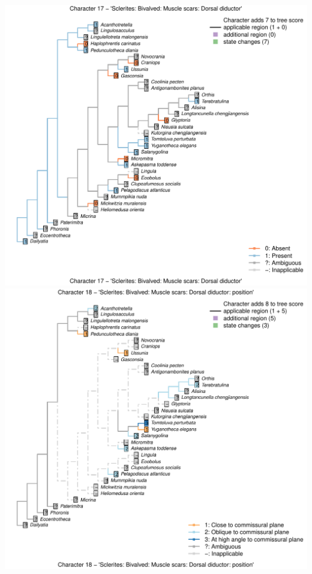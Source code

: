 \documentclass[]{book}
\theoremstyle{definition}
\theoremstyle{definition}
\theoremstyle{definition}
\theoremstyle{remark}
\begin{document}
\includegraphics{Brachiopod_phylogeny_files/figure-latex/unnamed-chunk-4-17.pdf}
\includegraphics{Brachiopod_phylogeny_files/figure-latex/unnamed-chunk-4-18.pdf}
\end{document}
